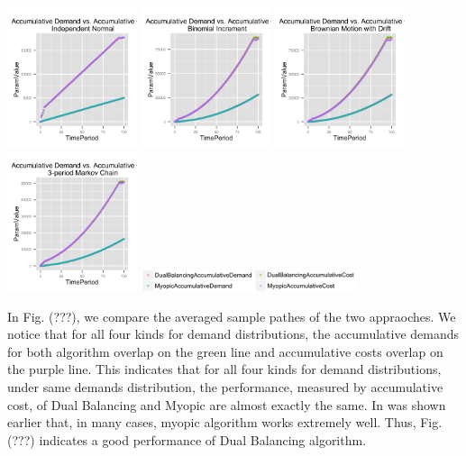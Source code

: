\documentclass[twoside]{article}
\begin{document}
\begin{multicols}{2}
  \includegraphics[width=1.5in]{figures/AccumulativeDemandAndCost_Normal.png}
  \includegraphics[width=1.5in]{figures/AccumulativeDemandAndCost_Binomial.png}
  \includegraphics[width=1.5in]{figures/AccumulativeDemandAndCost_Brownian.png}
  \includegraphics[width=1.5in]{figures/AccumulativeDemandAndCost_Markov.png}
  \includegraphics[width=2.5in]{figures/key.png}

In Fig. (???), we compare the averaged sample pathes of the two appraoches. We notice that for all four kinds for demand distributions, the accumulative demands for both algorithm overlap on the green line and accumulative costs overlap on the purple line. This indicates that for all four kinds for demand distributions, under same demands distribution, the performance, measured by accumulative cost, of Dual Balancing and Myopic are almost exactly the same. In was shown earlier\cite{CLAcha1} that, in many cases, myopic algorithm works extremely well. Thus, Fig. (???) indicates a good performance of Dual Balancing algorithm.



\end{multicols}
\end{document}
